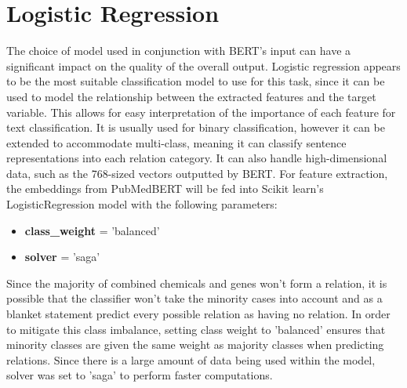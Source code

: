 \documentclass{l4proj}
\begin{document}
\section{Logistic Regression}
 The choice of model used in conjunction with BERT's input can have a significant impact on the quality of the overall output. Logistic regression appears to be the most suitable classification model to use for this task, since it can be used to model the relationship between the extracted features and the target variable. This allows for easy interpretation of the importance of each feature for text classification. It is usually used for binary classification, however it can be extended to accommodate multi-class, meaning it can classify sentence representations into each relation category. It can also handle high-dimensional data, such as the 768-sized vectors outputted by BERT. For feature extraction, the embeddings from PubMedBERT will be fed into Scikit learn's LogisticRegression model with the following parameters:

\begin{itemize}
    \item \textbf{class\_weight} = 'balanced'
    \item \textbf{solver} = 'saga'
\end{itemize}

Since the majority of combined chemicals and genes won't form a relation, it is possible that the classifier won't take the minority cases into account and as a blanket statement predict every possible relation as having no relation. In order to mitigate this class imbalance, setting class weight to 'balanced' ensures that minority classes are given the same weight as majority classes when predicting relations. Since there is a large amount of data being used within the model, solver was set to 'saga' to perform faster computations.



\end{document}

